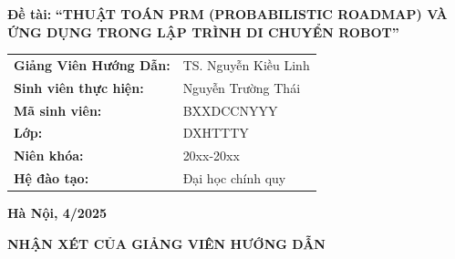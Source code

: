 \documentclass[12pt,a4paper,openany,oneside]{report}
\begin{document}
\vspace{1cm}
\begin{center}
\textbf{Đề tài:}
	\textbf{\MakeUppercase{ \bf ``THUẬT TOÁN PRM (PROBABILISTIC ROADMAP) VÀ ỨNG DỤNG TRONG LẬP TRÌNH DI CHUYỂN ROBOT''}}\\ 
\end{center} 
\vspace{2cm}


\begin{tabular}{ll}
	{\textbf{\large{Giảng Viên Hướng Dẫn: }}} & {\large TS. Nguyễn Kiều Linh}\\
	{\textbf{\large{Sinh viên thực hiện:}}}  & {\large Nguyễn Trường Thái} \\
	{\textbf{\large{Mã sinh viên: }}}  & {\large BXXDCCNYYY} \\
	{\textbf{\large{Lớp:}}}   & {\large DXHTTTY}\\
	{\textbf{\large{Niên khóa:}}}   & {\large 20xx-20xx}\\
	{\textbf{\large{Hệ đào tạo:}}}   & {\large Đại học chính quy}
\end{tabular}


\vfill
\begin{center}
	{{\bf Hà Nội, 4/2025}}
\end{center}


\thispagestyle{empty}
\begin{center}
	{\textbf{\Large{NHẬN XÉT CỦA GIẢNG VIÊN HƯỚNG DẪN}}}
\end{center}
\end{document}
